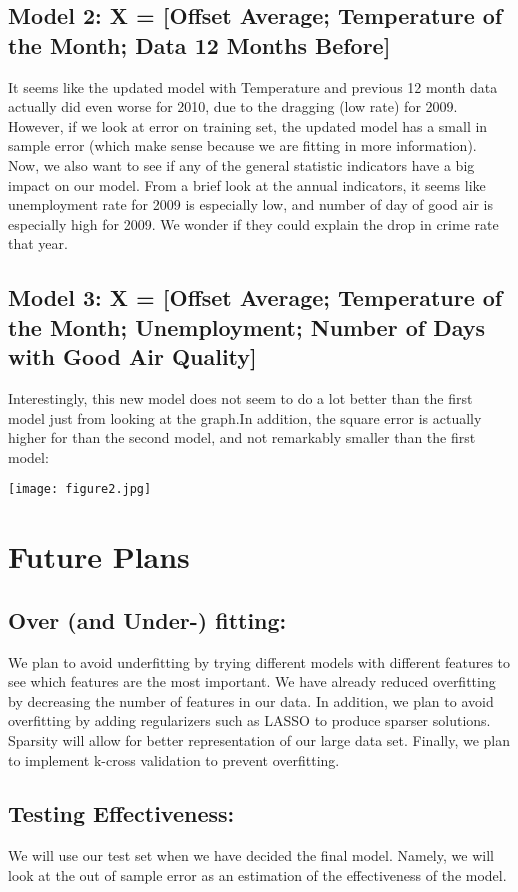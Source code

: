 \documentclass{article}
\begin{document}
\subsection*{Model 2: X = [Offset Average; Temperature of the Month; Data 12 Months Before]}
It seems like the updated model with Temperature and previous 12 month data actually did even worse for 2010, due to the dragging (low rate) for 2009. However, if we look at error on training set, the updated model has a small in sample error (which make sense because we are fitting in more information). 
Now, we also want to see if any of the general statistic indicators have a big impact on our model. From a brief look at the annual indicators, it seems like unemployment rate for 2009 is especially low, and number of day of good air is especially high for 2009. We wonder if they could explain the drop in crime rate that year. 

\subsection*{Model 3: X = [Offset Average; Temperature of the Month; Unemployment; Number of Days with Good Air Quality]}
Interestingly, this new model does not seem to do a lot better than the first model just from looking at the graph.In addition, the square error is actually higher for than the second model, and not remarkably smaller than the first model:

\centerline{\texttt{[image: figure2.jpg]}}


\section*{Future Plans}
\subsection*{Over (and Under-) fitting:}
We plan to avoid underfitting by trying different models with different features to see which features are the most important.  We have already reduced overfitting by decreasing the number of features in our data.  In addition, we plan to avoid overfitting by adding regularizers such as LASSO to produce sparser solutions.  Sparsity will allow for better representation of our large data set.  Finally, we plan to implement k-cross validation to prevent overfitting.

\subsection*{Testing Effectiveness:}
We will use our test set when we have decided the final model. Namely, we will look at the out of sample error as an estimation of the effectiveness of the model.
\end{document}
